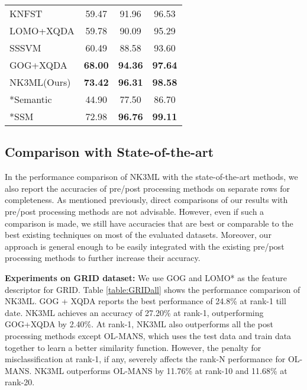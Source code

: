 \documentclass[runningheads]{llncs}
\begin{document}
\begin{table}[t]
\begin{center}
{\begin{tabular}[b]{|l|c|c|c|}
KNFST\cite{Zheng:nfst} &	 59.47	&	91.96	&	96.53\\
LOMO+XQDA\cite{LOMO}		&	59.78	&	90.09	&	95.29	\\
SSSVM\cite{SSSVM}		&	60.49	&	88.58	&	93.60	\\
GOG+XQDA\cite{GOG}		&	\color{blue}\textbf{68.00} 	&	\color{blue}\textbf{94.36}	&	\color{blue}\textbf{97.64}	\\
NK3ML(Ours) & \color{red}\textbf{73.42}	& \color{red}\textbf{96.31}	& \color{red}\textbf{98.58}\\
\hline \hline
*Semantic\cite{Symantic}		&	44.90	&	77.50	&	86.70	\\
*SSM\cite{song:scalableManifold}	&	72.98	&	\color{red}\textbf{96.76}	&	\color{red}\textbf{99.11}	\\
\hline
\end{tabular}
\label{table:PRID450Sall}
}
\end{center}
\end{table}

\subsection{Comparison with State-of-the-art}
In the performance comparison of NK3ML with the state-of-the-art methods, \color{black} we also report the accuracies of pre/post processing methods on separate rows for completeness. As mentioned previously, direct comparisons of our results with pre/post processing methods are not advisable. However, even if such a comparison is made, we still have accuracies that are best or comparable to the best existing techniques on most of the evaluated datasets. Moreover, our approach is general enough to be easily integrated with the existing pre/post processing methods to further increase their accuracy. 


\setlength{\parskip}{0.5mm}
\noindent \textbf{Experiments on GRID dataset:} We use GOG and LOMO* as the feature descriptor for GRID. 
Table \ref{table:GRIDall} shows the performance comparison of NK3ML. 
 GOG + XQDA\cite{GOG} reports the best performance of 24.8\% at rank-1 till date. NK3ML achieves an accuracy of 27.20\% at rank-1, outperforming GOG+XQDA by 2.40\%. 
At rank-1, NK3ML also outperforms all the post processing methods except OL-MANS\cite{OnlineNegSamples}, which uses the test data and train data together to learn a better similarity function. However, the penalty for misclassification at rank-1, if any,  severely affects the rank-N performance for OL-MANS. NK3ML outperforms OL-MANS by 11.76\% at rank-10 and 11.68\% at rank-20.
\end{document}
